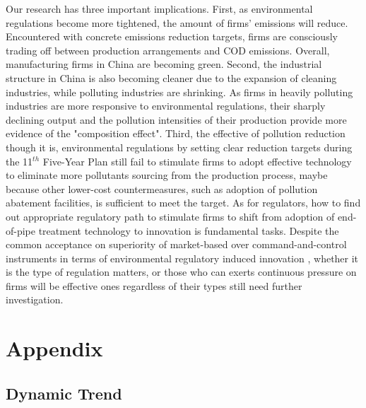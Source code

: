 \documentclass[12pt,english]{article}
\begin{document}
Our research has three important implications. First, as environmental regulations become more tightened, the amount of firms' emissions will reduce. Encountered with concrete emissions reduction targets, firms are consciously trading off between production arrangements and COD emissions. Overall, manufacturing firms in China are becoming green. Second, the industrial structure in China is also becoming cleaner due to the expansion of cleaning industries, while polluting industries are shrinking. As firms in heavily polluting industries are more responsive to environmental regulations, their sharply declining output and the pollution intensities of their production provide more evidence of the "composition effect". Third, the effective of pollution reduction though it is, environmental regulations by setting clear reduction targets during the 11$^{th}$ Five-Year Plan still fail to stimulate firms to adopt effective technology to eliminate more pollutants sourcing from the production process, maybe because other lower-cost countermeasures, such as adoption of pollution abatement facilities, is sufficient to meet the target. As for regulators, how to find out appropriate regulatory path to stimulate firms to shift from adoption of end-of-pipe treatment technology to innovation is fundamental tasks. Despite the common acceptance on superiority of market-based over command-and-control instruments in terms of environmental regulatory induced innovation \citep*{ambec2013porter}, whether it is the type of regulation matters, or those who can exerts continuous pressure on firms will be effective ones regardless of their types still need further investigation.

\clearpage

\setcounter{table}{0}
\setcounter{figure}{0}
\renewcommand{\thetable}{A\arabic{table}}
\renewcommand{\thefigure}{A\arabic{figure}}
\renewcommand{\thesubsection}{Appendix \Alph{subsection}}
\renewcommand{\thesubsubsection}{Appendix \Alph{subsection}.\arabic{subsubsection}}
\clearpage
\newpage



\clearpage
\newpage
\section*{Appendix}

\subsection{Dynamic Trend}
\end{document}
